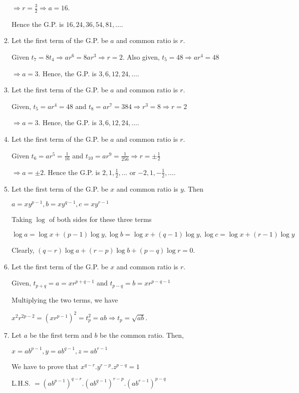 \begin{enumerate}
  $\Rightarrow r = \frac{3}{2} \Rightarrow a = 16$.

  Hence the G.P. is $16, 24, 36, 54, 81, \ldots$.
\item Let the first term of the G.P. be $a$ and common ratio is $r$.

  Given $t_7 = 8t_4 \Rightarrow ar^6 = 8ar^3 \Rightarrow r = 2$. Also given, $t_5 = 48 \Rightarrow ar^4 = 48$

  $\Rightarrow a = 3$. Hence, the G.P. is $3, 6, 12, 24, \ldots$.
\item Let the first term of the G.P. be $a$ and common ratio is $r$.

  Given, $t_5 = ar^4 = 48$ and $t_8 = ar^7 = 384 \Rightarrow r^3 = 8 \Rightarrow r = 2$

  $\Rightarrow a = 3$. Hence, the G.P. is $3, 6, 12, 24, \ldots$.
\item Let the first term of the G.P. be $a$ and common ratio is $r$.

  Given $t_6 = ar^5 = \frac{1}{16}$ and $t_{10} = ar^9 = \frac{1}{256} \Rightarrow r = \pm\frac{1}{2}$

  $\Rightarrow a = \pm 2$. Hence the G.P. is $2, 1, \frac{1}{2}, \ldots$ or $-2, 1, -\frac{1}{2}, \ldots$.
\item Let the first term of the G.P. be $x$ and common ratio is $y$. Then

  $a = xy^{p - 1}, b = xy^{q - 1},  c = xy^{r - 1}$

  Taking $\log$ of both sides for these three terms

  $\log a = \log x + (p - 1)\log y, \log b = \log x + (q - 1)\log y, \log c = \log x + (r - 1)\log y$

  Clearly, $(q - r)\log a + (r - p)\log b + (p - q)\log r = 0$.
\item Let the first term of the G.P. be $x$ and common ratio is $r$.

  Given, $t_{p + q} = a = xr^{p + q - 1}$ and $t_{p - q} = b = xr^{p - q - 1}$

  Multiplying the two terms, we have

  $x^2r^{2p - 2} = (xr^{p - 1})^2 = t_p^2 = ab \Rightarrow t_p = \sqrt{ab}$.
\item Let $a$ be the first term and $b$ be the common ratio. Then,

  $x = ab^{p - 1}, y = ab^{q - 1}, z = ab^{r -1}$

  We have to prove that $x^{q - r}.y^{r - p}.z^{p - q} = 1$

  L.H.S. $= (ab^{p - 1})^{q - r}.(ab^{q - 1})^{r - p}.(ab^{r - 1})^{p - q}$


\end{enumerate}
